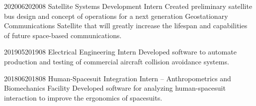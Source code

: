 \documentclass[../Gabriel_Roper_Resume]{subfiles}
\begin{document}

        {2020}{06}{2020}{08}
        {Satellite Systems Development Intern}
        {Created preliminary satellite bus design and concept of operations 
        for a next generation Geostationary Communications Satellite that will greatly increase the 
        lifespan and capabilities of future space-based communications. }

        {2019}{05}{2019}{08}
        {Electrical Engineering Intern}
        {Developed software to automate production and testing of commercial aircraft
            collision avoidance systems.}

        {2018}{06}{2018}{08}
        {Human-Spacesuit Integration Intern -- Anthropometrics and Biomechanics Facility}
        {Developed software for analyzing human-spacesuit interaction to improve the ergonomics
            of spacesuits.}

\end{document}
